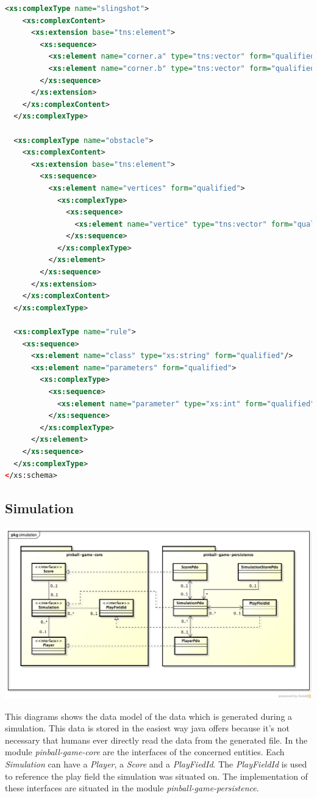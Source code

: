 \documentclass[fontsize=12pt,
               paper=a4,
               twoside=false,
               parskip=half,
               ]{scrartcl}
\begin{document}
\begin{lstlisting}[language=xml,label=lst:default_playfield,caption={schema for playfields.xml}]
  <xs:complexType name="slingshot">
    <xs:complexContent>
      <xs:extension base="tns:element">
        <xs:sequence>
          <xs:element name="corner.a" type="tns:vector" form="qualified"/>
          <xs:element name="corner.b" type="tns:vector" form="qualified"/>
        </xs:sequence>
      </xs:extension>
    </xs:complexContent>
  </xs:complexType>

  <xs:complexType name="obstacle">
    <xs:complexContent>
      <xs:extension base="tns:element">
        <xs:sequence>
          <xs:element name="vertices" form="qualified">
            <xs:complexType>
              <xs:sequence>
                <xs:element name="vertice" type="tns:vector" form="qualified" maxOccurs="unbounded"/>
              </xs:sequence>
            </xs:complexType>
          </xs:element>
        </xs:sequence>
      </xs:extension>
    </xs:complexContent>
  </xs:complexType>

  <xs:complexType name="rule">
    <xs:sequence>
      <xs:element name="class" type="xs:string" form="qualified"/>
      <xs:element name="parameters" form="qualified">
        <xs:complexType>
          <xs:sequence>
            <xs:element name="parameter" type="xs:int" form="qualified" maxOccurs="unbounded"/>
          </xs:sequence>
        </xs:complexType>
      </xs:element>
    </xs:sequence>
  </xs:complexType>
</xs:schema>
\end{lstlisting}


\subsection{Simulation}

\includegraphics[width=15.5cm]{./img/persistence-simulation.png}

This diagrams shows the data model of the data which is generated during a simulation. This data is stored in the easiest way java offers because it's not necessary that humans ever directly read the data from the generated file. In the module \emph{pinball-game-core} are the interfaces of the concerned entities. Each \emph{Simulation} can have a \emph{Player}, a \emph{Score} and a \emph{PlayFiedId}. The \emph{PlayFieldId} is used to reference the play field the simulation was situated on. The implementation of these interfaces are situated in the module \emph{pinball-game-persistence}.
\end{document}
